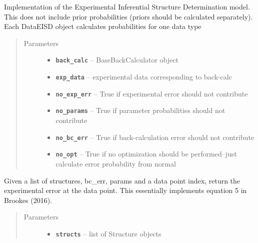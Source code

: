 \documentclass[letterpaper,10pt,english]{sphinxmanual}
\begin{document}
\begin{fulllineitems}
\label{modules:eisd.DataEISD}
Implementation of the Experimental Inferential Structure Determination
model. This does not include prior probabilities (priors should be
calculated separately). Each DataEISD object calculates probabilities
for one data type
\begin{quote}\begin{description}
\item[{Parameters}] \leavevmode\begin{itemize}
\item {} 
\textbf{\texttt{back\_calc}} -- BaseBackCalculator object

\item {} 
\textbf{\texttt{exp\_data}} -- experimental data corresponding to back-calc

\item {} 
\textbf{\texttt{no\_exp\_err}} -- True if experimental error should not contribute

\item {} 
\textbf{\texttt{no\_params}} -- True if parameter probabilities should not contribute

\item {} 
\textbf{\texttt{no\_bc\_err}} -- True if back-calculation error should not contribute

\item {} 
\textbf{\texttt{no\_opt}} -- True if no optimization should be performed--just calculate error probability from normal

\end{itemize}

\end{description}\end{quote}

\begin{fulllineitems}
\label{modules:eisd.DataEISD._eval}
Given a list of structures,  bc\_err, params and a data point index,
return the experimental error at the data point. This essentially
implements equation 5 in Brookes (2016).
\begin{quote}\begin{description}
\item[{Parameters}] \leavevmode\begin{itemize}
\item {} 
\textbf{\texttt{structs}} -- list of Structure objects


\end{itemize}
\end{description}
\end{quote}
\end{fulllineitems}
\end{fulllineitems}
\end{document}
